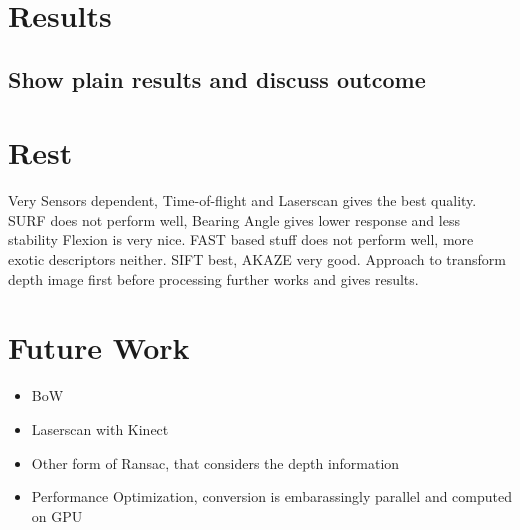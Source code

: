 \section{Results}
\subsection{Show plain results and discuss outcome}

\section{Rest}

Very Sensors dependent, Time-of-flight and Laserscan gives the best quality.
SURF does not perform well, Bearing Angle gives lower response and less stability
Flexion is very nice.
FAST based stuff does not perform well, more exotic descriptors neither.
SIFT best, AKAZE very good.
Approach to transform depth image first before processing further works and gives results.

\section{Future Work}

\begin{itemize}
    \item BoW
    \item Laserscan with Kinect
    \item Other form of Ransac, that considers the depth information
    \item Performance Optimization, conversion is embarassingly parallel and computed on GPU
\end{itemize}
